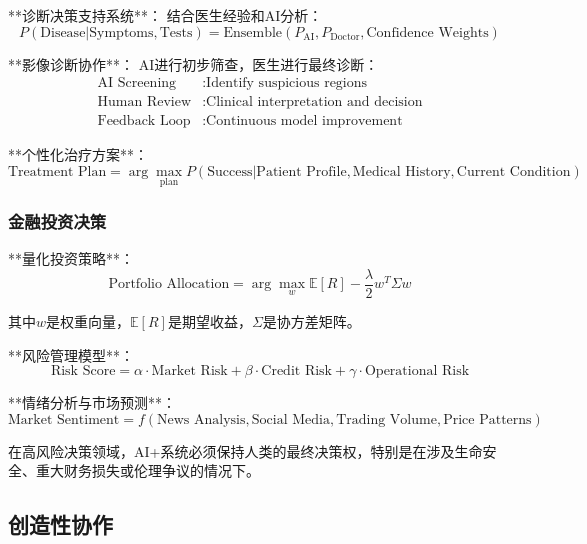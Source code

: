 **诊断决策支持系统**：
结合医生经验和AI分析：
\begin{equation}
P(\text{Disease}|\text{Symptoms}, \text{Tests}) = \text{Ensemble}(P_{\text{AI}}, P_{\text{Doctor}}, \text{Confidence Weights})
\end{equation}

**影像诊断协作**：
AI进行初步筛查，医生进行最终诊断：
\begin{align}
\text{AI Screening} &: \text{Identify suspicious regions} \\
\text{Human Review} &: \text{Clinical interpretation and decision} \\
\text{Feedback Loop} &: \text{Continuous model improvement}
\end{align}

**个性化治疗方案**：
\begin{equation}
\text{Treatment Plan} = \arg\max_{\text{plan}} P(\text{Success}|\text{Patient Profile}, \text{Medical History}, \text{Current Condition})
\end{equation}

\subsubsection{金融投资决策} %

**量化投资策略**：
\begin{equation}
\text{Portfolio Allocation} = \arg\max_w \mathbb{E}[R] - \frac{\lambda}{2} w^T \Sigma w
\end{equation}

其中$w$是权重向量，$\mathbb{E}[R]$是期望收益，$\Sigma$是协方差矩阵。

**风险管理模型**：
\begin{equation}
\text{Risk Score} = \alpha \cdot \text{Market Risk} + \beta \cdot \text{Credit Risk} + \gamma \cdot \text{Operational Risk}
\end{equation}

**情绪分析与市场预测**：
\begin{equation}
\text{Market Sentiment} = f(\text{News Analysis}, \text{Social Media}, \text{Trading Volume}, \text{Price Patterns})
\end{equation}

\begin{center}
在高风险决策领域，AI+系统必须保持人类的最终决策权，特别是在涉及生命安全、重大财务损失或伦理争议的情况下。
\end{center}

\subsection{创造性协作}


